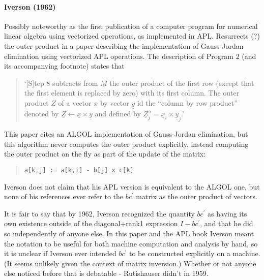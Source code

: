 \paragraph{Iverson (1962)~\cite{Iverson1962}}

Possibly noteworthy as the first publication of a computer program for numerical linear algebra using vectorized operations, as implemented in APL.
Resurrects (?) the outer product in a paper describing the implementation of Gauss-Jordan elimination using vectorized APL operations. The description of Program 2 (and its accompanying footnote) states that

\begin{quote}
`[S]tep 8 subtracts from $\underline{\textit{M}}$ the outer product of the first row (except that the first element is replaced by zero) with its first column. The outer product $\underline{\textit{Z}}$ of a vector $\underline{\textit{x}}$ by vector $\underline{\textit{y}}$ id the ``column by row product'' denoted by $\underline{\textit{Z}} \leftarrow \underline{\textit{x}} \times \underline{\textit{y}}$ and defined by $\underline{\textit{Z}}^{\; i}_j = \underline{\textit{x}}_i \times \underline{\textit{y}}_j$.'
\end{quote}

This paper cites an ALGOL implementation of Gauss-Jordan elimination, but this algorithm never computes the outer product explicitly, instead computing the outer product on the fly as part of the update of the matrix:~\cite{Cohen1961}

\begin{quote}
\begin{verbatim}
a[k,j] := a[k,i] - b[j] x c[k]
\end{verbatim}
\end{quote}

Iverson does not claim that his APL version is equivalent to the ALGOL one, but none of his references ever refer to the $b c^\prime$ matrix as the outer product of vectors.

It is fair to say that by 1962, Iverson recognized the quantity $b c^\prime$ as having its own existence outside of the diagonal+rank1 expression $I - b c^\prime$, and that he did so independently of anyone else. In this paper and the APL book Iverson meant the notation to be useful for both machine computation and analysis by hand, so it is unclear if Iverson ever intended $b c^\prime$ to be constructed explicitly on a machine. (It seems unlikely given the context of matrix inversion.) Whether or not anyone else noticed before that is debatable - Rutishauser didn't in 1959.

